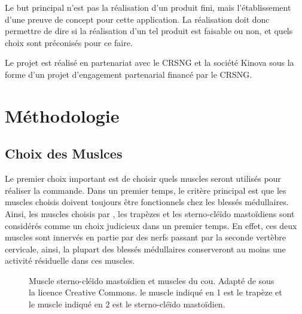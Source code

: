 \documentclass[letterpaper, twoside, 12pt, memoire, creativecommons, hyperref]{thETS}
\begin{document}
Le but principal n'est pas la réalisation d'un produit fini, mais l'établissement d'une preuve de concept pour cette application. La réalisation doit donc permettre de dire si la réalisation d'un tel produit est faisable ou non, et quels choix sont préconisés pour ce faire.

Le projet est réalisé en partenariat avec le CRSNG et la société Kinova sous la forme d'un projet d'engagement partenarial financé par le CRSNG. 

\chapter{Méthodologie}
\label{CHmethodo}

\section{Choix des Muslces}

Le premier choix important est de choisir quels muscles seront utilisés pour réaliser la commande. Dans un premier temps, le critère principal est que les muscles choisis doivent toujours être fonctionnels chez les blessés médullaires. Ainsi, les muscles choisis par \cite{Chang1996}, les trapèzes et les sterno-cléïdo mastoïdiens sont considérés comme un choix judicieux dans un premier temps. En effet, ces deux muscles sont innervés en partie par des nerfs passant par la seconde vertèbre cervicale, ainsi, la plupart des blessés médullaires conserveront au moins une activité résiduelle dans ces muscles. 

\begin{figure}
	\centering
	\caption{Muscle sterno-cléïdo mastoïdien et muscles du cou. Adapté de \cite{sternoWiki} sous la licence Creative Commons. le muscle indiqué en 1 est le trapèze et le muscle indiqué en 2 est le sterno-cléïdo mastoïdien.}
	\label{fig:muscles}
\end{figure}
\end{document}
